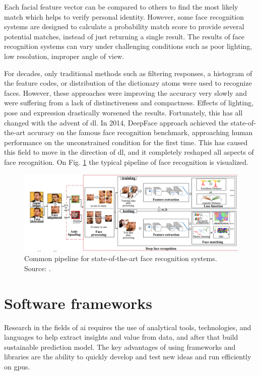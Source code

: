         Each facial feature vector can be compared to others to find the most likely match which helps to verify personal identity. However, some face recognition systems are designed to calculate a probability match score to provide several potential matches, instead of just returning a single result. The results of face recognition systems can vary under challenging conditions such as poor lighting, low resolution, improper angle of view.
        
        For decades, only traditional methods such as filtering responses, a histogram of the feature codes, or distribution of the dictionary atoms were used to recognize faces. However, these approaches were improving the accuracy very slowly and were suffering from a lack of distinctiveness and compactness. Effects of lighting, pose and expression drastically worsened the results. Fortunately, this has all changed with the advent of \gls{dl}. In 2014, DeepFace \cite{taigman2014deepface} approach achieved the state-of-the-art accuracy on the famous face recognition benchmark, approaching human performance on the unconstrained condition for the first time. This has caused this field to move in the direction of \gls{dl}, and it completely reshaped all aspects of face recognition. On Fig. \ref{fig:deep face recognition} the typical pipeline of face recognition is visualized.
        
        \begin{figure}[ht]
            \centering
            \includegraphics[width=1\textwidth]{resources/deep_face_recognition.png}
            \caption{Common pipeline for state-of-the-art face recognition systems. Source: \cite{wang2018deep}.}
            \label{fig:deep face recognition}
        \end{figure}

\section{Software frameworks}
    Research in the fields of \gls{ai} requires the use of analytical tools, technologies, and languages to help extract insights and value from data, and after that build sustainable prediction model. The key advantages of using frameworks and libraries are the ability to quickly develop and test new ideas and run efficiently on \gls{gpu}s.

